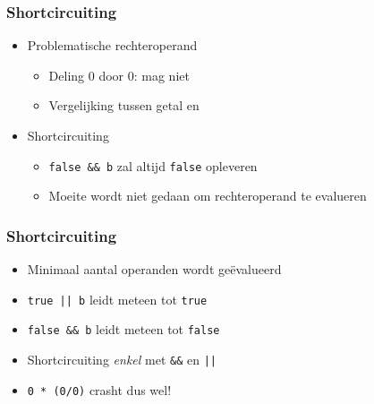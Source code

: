 \documentclass{../khlslides}
\begin{document}
\begin{frame}
  \frametitle{Shortcircuiting}
  \vskip4mm
  \begin{overprint}


  \end{overprint}
  \begin{itemize}
    \item Problematische rechteroperand
          \begin{itemize}
            \item Deling 0 door 0: mag niet
            \item Vergelijking tussen getal en 
          \end{itemize}
    \item Shortcircuiting
          \begin{itemize}
            \item {\tt false \&\& b} zal altijd {\tt false} opleveren
            \item Moeite wordt niet gedaan om rechteroperand te evalueren
          \end{itemize}
  \end{itemize}
\end{frame}


\begin{frame}
  \frametitle{Shortcircuiting}
  \begin{itemize}
    \item Minimaal aantal operanden wordt ge\"evalueerd
    \item {\tt true || b} leidt meteen tot {\tt true}
    \item {\tt false \&\& b} leidt meteen tot {\tt false}
    \item Shortcircuiting \emph{enkel} met {\tt \&\&} en {\tt ||}
    \item {\tt 0 * (0/0)} crasht dus wel!
  \end{itemize}
\end{frame}
\end{document}
